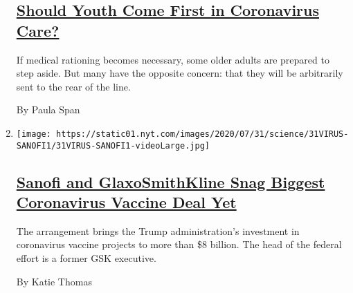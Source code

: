 \begin{enumerate}
{  \subsection{\texorpdfstring{\href{/2020/07/31/health/coronavirus-ethics-rationing-elderly.html}{Should
  Youth Come First in Coronavirus
  Care?}}{Should Youth Come First in Coronavirus Care?}}\label{should-youth-come-first-in-coronavirus-care}}

  If medical rationing becomes necessary, some older adults are prepared
  to step aside. But many have the opposite concern: that they will be
  arbitrarily sent to the rear of the line.

  By Paula Span
\item
  \texttt{[image: https://static01.nyt.com/images/2020/07/31/science/31VIRUS-SANOFI1/31VIRUS-SANOFI1-videoLarge.jpg]}

  \hypertarget{sanofi-and-glaxosmithkline-snag-biggest-coronavirus-vaccine-deal-yet}{%
  \subsection{\texorpdfstring{\href{/2020/07/31/health/covid-19-vaccine-sanofi-gsk.html}{Sanofi
  and GlaxoSmithKline Snag Biggest Coronavirus Vaccine Deal
  Yet}}{Sanofi and GlaxoSmithKline Snag Biggest Coronavirus Vaccine Deal Yet}}\label{sanofi-and-glaxosmithkline-snag-biggest-coronavirus-vaccine-deal-yet}}

  The arrangement brings the Trump administration's investment in
  coronavirus vaccine projects to more than \$8 billion. The head of the
  federal effort is a former GSK executive.

  By Katie Thomas
\end{enumerate}


